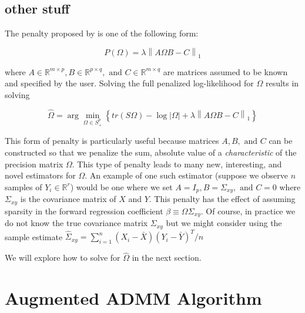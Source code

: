 \documentclass[11pt,]{report}
\begin{document}
\hypertarget{other-stuff}{%
\subsection{other stuff}\label{other-stuff}}

The penalty proposed by \citet{molstad2017shrinking} is one of the following form:

\begin{equation}
P\left(\Omega\right) = \lambda\left\| A\Omega B - C \right\|_{1}
\label{eq:pen2}
\end{equation}

where \(A \in \mathbb{R}^{m \times p}, B \in \mathbb{R}^{p \times q}, \mbox{ and } C \in \mathbb{R}^{m \times q}\) are matrices assumed to be known and specified by the user. Solving the full penalized log-likelihood for \(\Omega\) results in solving

\begin{equation}
\hat{\Omega} = \arg\min_{\Omega \in S_{+}^{p}}\left\{ tr\left(S\Omega\right) - \log\left|\Omega \right| + \lambda\left\| A\Omega B - C \right\|_{1} \right\}
\label{eq:omegaloglik2}
\end{equation}

This form of penalty is particularly useful because matrices \(A, B, \mbox{ and } C\) can be constructed so that we penalize the sum, absolute value of a \emph{characteristic} of the precision matrix \(\Omega\). This type of penalty leads to many new, interesting, and novel estimators for \(\Omega\). An example of one such estimator (suppose we observe \(n\) samples of \(Y_{i} \in \mathbb{R}^{r}\)) would be one where we set \(A = I_{p}, B = \Sigma_{xy}, \mbox{ and } C = 0\) where \(\Sigma_{xy}\) is the covariance matrix of \(X\) and \(Y\). This penalty has the effect of assuming sparsity in the forward regression coefficient \(\beta \equiv \Omega\Sigma_{xy}\). Of course, in practice we do not know the true covariance matrix \(\Sigma_{xy}\) but we might consider using the sample estimate \(\hat{\Sigma}_{xy} = \sum_{i = 1}^{n}\left(X_{i} - \bar{X}\right)\left(Y_{i} - \bar{Y}\right)^{T}/n\)

We will explore how to solve for \(\hat{\Omega}\) in the next section.

\hypertarget{augmented-admm-algorithm}{%
\section{Augmented ADMM Algorithm}\label{augmented-admm-algorithm}}
\end{document}
